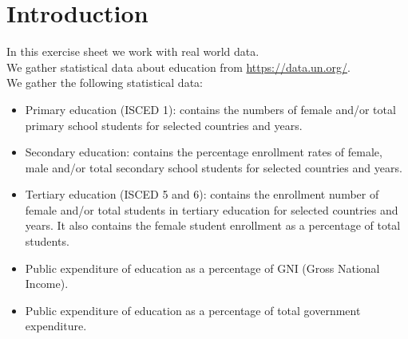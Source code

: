 \section{Introduction}
\label{Introduction}
In this exercise sheet we work with real world data.\\
We gather statistical data about education from \href{https://data.un.org/}{https://data.un.org/}.\\
We gather the following statistical data:
\begin{itemize}
    \item Primary education (ISCED 1): contains the numbers of female and/or total primary school
    students for selected countries and years.
    \item Secondary education: contains the percentage enrollment rates of female, male and/or
    total secondary school students for selected countries and years.
    \item Tertiary education (ISCED 5 and 6): contains the enrollment number of female and/or
    total students in tertiary education for selected countries and years. It also contains the
    female student enrollment as a percentage of total students.
    \item  Public expenditure of education as a percentage of GNI (Gross National Income).
    \item Public expenditure of education as a percentage of total government expenditure.
\end{itemize}
